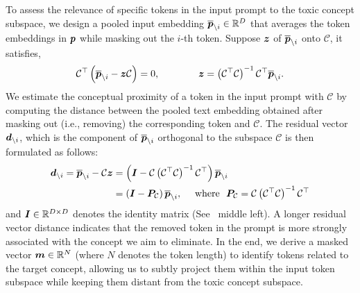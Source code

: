  To assess the relevance of specific tokens in the input prompt to the toxic concept subspace, we design a pooled input embedding \(\overline{\boldsymbol{p}}_{\backslash i} \in \mathbb{R}^{D}\) that averages the token embeddings in \(\boldsymbol{p}\) while masking out the \(i\)-th token.
Suppose $\boldsymbol{z}$  
of $\overline{\boldsymbol{p}}_{\backslash i}$ onto $\mathcal{C}$, it satisfies, 
\begin{equation}
\begin{split}
{\mathcal{C}}^\top\left(\overline{\boldsymbol{p}}_{\backslash i}-\boldsymbol{z}\mathcal{C}\right)=0,\quad\quad\quad\quad
\boldsymbol{z}=\left({\mathcal{C}}^\top\mathcal{C}\right)^{-1}{\mathcal{C}}^\top \overline{\boldsymbol{p}}_{\backslash i}.
\end{split}
\end{equation}
We estimate the conceptual proximity of a token in the input prompt with $\mathcal{C}$ by computing the distance between the pooled text embedding obtained after masking out (i.e., removing) the corresponding token and $\mathcal{C}$. 
The residual vector \(\boldsymbol{d}_{\backslash i}\), which is the component of \(\overline{\boldsymbol{p}}_{\backslash i}\) orthogonal to the subspace \(\mathcal{C}\) is then formulated as follows:
\begin{equation}
\begin{split}\label{eq:residual}
\boldsymbol{d}_{\backslash i}=\overline{\boldsymbol{p}}_{\backslash i}-\mathcal{C}\boldsymbol{z}
&=\left(\boldsymbol{I}-\mathcal{C}\left({\mathcal{C}}^\top\mathcal{C}\right)^{-1}{\mathcal{C}}^\top\right)\overline{\boldsymbol{p}}_{\backslash i}\\
&=\left(\boldsymbol{I}-\boldsymbol{P}_{\mathcal{C}}\right) \overline{\boldsymbol{p}}_{\backslash i},~~~~\text{where}~~\boldsymbol{P}_{\mathcal{C}}=\mathcal{C}\left({\mathcal{C}}^\top\mathcal{C}\right)^{-1}{\mathcal{C}}^\top
\end{split}
\end{equation}
and $\boldsymbol{I}\in\mathbb{R}^{D \times D}$ denotes the identity matrix (See~ middle left).
A longer residual vector distance indicates that the removed token in the prompt is more strongly associated with the concept we aim to eliminate. In the end, we derive a masked vector $\boldsymbol{m}\in\mathbb{R}^{N}$ (where $N$ denotes the token length) to identify tokens related to the target concept, allowing us to subtly project them within the input token subspace while keeping them distant from the toxic concept subspace.
